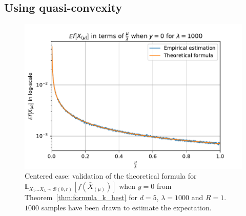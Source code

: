 \subsection{Using quasi-convexity}\label{qc}
\begin{figure}[t]
    \centering
    \includegraphics[width=.45\textwidth]{sections/appendix/ppsn2020-kbest/imgs/fig_y=0}
    \caption{Centered case: validation of the theoretical formula for $\mathbb{E}_{X_1...X_\lambda\sim\mathcal{B}(0,r)}\left[ f(\bar X_{(\mu)})\right]$ when $y=0$ from Theorem~\ref{thm:formula_k_best} for $d=5$, $\lambda=1000$ and $R=1$. $1000$  samples have been drawn to estimate the expectation. }
    \label{fig:exp_th_c}
\end{figure}


